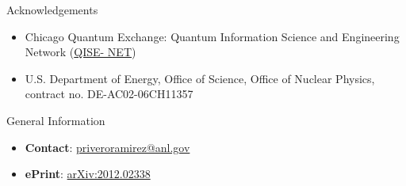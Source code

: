 \documentclass[final]{beamer}
\newlength{\onecolwid}
\begin{document}
\begin{frame}[t]
\begin{columns}[t]
\begin{column}{\onecolwid}

%
%



\begin{block}{Acknowledgements}

  \begin{small}
  \begin{itemize}
    \item Chicago Quantum Exchange: Quantum Information Science and Engineering Network (\href{https://qisenet.uchicago.edu/overview/}{QISE- NET})
    \item U.S. Department of Energy, Office of Science, Office of Nuclear Physics, contract no. DE-AC02-06CH11357
  \end{itemize}
  \end{small}

\end{block}



\begin{alertblock}{General Information}

  \begin{itemize}
    \item \textbf{Contact}: \href{mailto:priveroramirez@anl.gov}{priveroramirez@anl.gov}
    \item \textbf{ePrint}: \href{https://arxiv.org/abs/2012.02338}{arXiv:2012.02338}
  \end{itemize}

\end{alertblock}


\end{column} %
\end{columns} %
\end{frame} %

\end{document}
